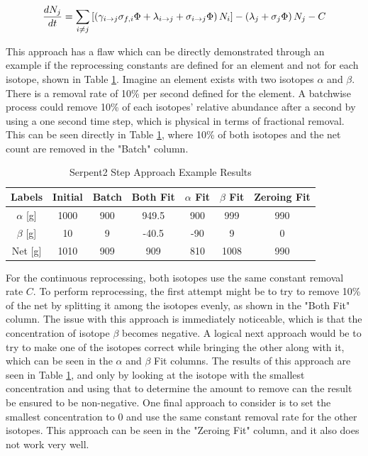 \begin{equation} \hfill
\frac{dN_j}{dt} = \sum_{i \neq j} \left [ \left( \gamma_{i \rightarrow j} \sigma_{f, i} \Phi + \lambda _{i \rightarrow j} + \sigma_{i \rightarrow j} \Phi \right) N_i \right ] - \left ( \lambda_j + \sigma_j \Phi \right ) N_j - C
\hfill\label{eq:Bateman_diff_second_example} \end{equation}

This approach has a flaw which can be directly demonstrated through an example if the reprocessing constants are defined for an element and not for each isotope, shown in Table \ref{tab:cont_repr_appr}. Imagine an element exists with two isotopes $\alpha$ and $\beta$. There is a removal rate of 10\% per second defined for the element. A batchwise process could remove 10\% of each isotopes' relative abundance after a second by using a one second time step, which is physical in terms of fractional removal. This can be seen directly in Table \ref{tab:cont_repr_appr}, where 10\% of both isotopes and the net count are removed in the "Batch" column.

\begin{table}[ht]
\renewcommand{\arraystretch}{1.25}
\caption{Serpent2 Step Approach Example Results}
\label{tab:cont_repr_appr}
\begin{center}
\begin{tabular}{ c | c | c | c | c | c | c }
 \hline
 Labels & Initial & Batch & Both Fit & $\alpha$ Fit & $\beta$ Fit & Zeroing Fit\\
 \hline
 \hline
$\alpha$ [g] & 1000 & 900 & 949.5 & 900 & 999 & 990\\
$\beta$ [g] & 10 & 9 & -40.5 & -90 & 9 & 0\\
 \hline
 Net [g] & 1010 & 909 & 909 & 810 & 1008 & 990 \\
 \hline
\end{tabular}
\end{center}
\end{table}

For the continuous reprocessing, both isotopes use the same constant removal rate $C$. %
To perform reprocessing, the first attempt might be to try to remove 10\% of the net by splitting it among the isotopes evenly, as shown in the "Both Fit" column. The issue with this approach is immediately noticeable, which is that the concentration of isotope $\beta$ becomes negative. A logical next approach would be to try to make one of the isotopes correct while bringing the other along with it, which can be seen in the $\alpha$ and $\beta$ Fit columns. The results of this approach are seen in Table \ref{tab:cont_repr_appr}, and only by looking at the isotope with the smallest concentration and using that to determine the amount to remove can the result be ensured to be non-negative. One final approach to consider is to set the smallest concentration to 0 and use the same constant removal rate for the other isotopes. This approach can be seen in the "Zeroing Fit" column, and it also does not work very well.

